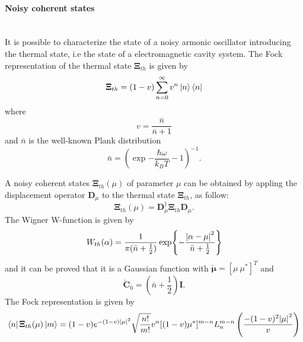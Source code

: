     \paragraph{Noisy coherent states}\mbox{} \\
        It is possible to characterize the state of a noisy armonic oscillator introducing
        the thermal state, i.e the state of a electromagnetic cavity system.
        The Fock representation of the thermal state $\pmb{\Xi}_{th}$ is given by \cite{tesiGuerrini}
        \begin{equation}
            \pmb{\Xi}_{th}=(1-v)\sum_{n=0}^{\infty}v^n\ket{n}\bra{n}
        \end{equation}
        where
        \begin{equation*}
            v=\frac{\bar{n}}{\bar{n}+1}
        \end{equation*}
        and $\bar{n}$ is the well-known Plank distribution
        \begin{equation*}
            \bar{n}=\left(\exp{-\frac{\hbar\omega}{k_B T}-1}\right)^{-1}.
        \end{equation*}

        A noisy coherent states $\pmb{\Xi}_{th}(\mu)$ of parameter $\mu$ can be obtained by 
        appling the displacement operator $\pmb{D}_\mu$ to the thermal state $\pmb{\Xi}_{th}$,
        as follow:
        \begin{equation}
            \pmb{\Xi}_{th}(\mu)=\pmb{D}_\mu^\dagger \pmb{\Xi}_{th} \pmb{D}_\mu.
        \end{equation}
        The Wigner W-function is given by
        \begin{equation}
            W_{th}(\alpha)=\frac{1}{\pi(\bar{n}+\frac{1}{2})}\exp{-\frac{\absolutevalue{\alpha-\mu}^2}
            {\bar{n}+\frac{1}{2}}}
        \end{equation}
        and it can be proved that it is a Gaussian function with $\check{\pmb{\mu}}=[\mu\ \mu^*]^T$
        and
        \begin{equation*}
            \check{\pmb{C}}_0=\left(\bar{n}+\frac{1}{2}\right)\pmb{I}.
        \end{equation*}
        The Fock representation is given by
        \begin{equation}
            \bra{n}\pmb{\Xi}_{th}(\mu)\ket{m}=(1-v)e^{-(1-v)\absolutevalue{\mu}^2}\sqrt{\frac{n!}{m!}}
            v^n[(1-v)\mu^*]^{m-n}L_n^{m-n}\left(\frac{-(1-v)^2\absolutevalue{\mu}^2}{v}\right)
            \label{eq:FRCS}
        \end{equation}


